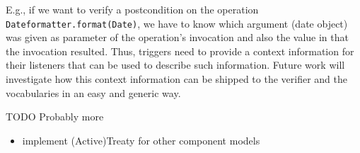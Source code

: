 \documentclass{llncs}
\begin{document}
E.g., if we want to verify a postcondition on the operation \texttt{Date\-for\-mat\-ter\linebreak[0].for\-mat(Date)}, we have to know which argument (date object) was given as parameter of the operation's invocation and also the value in that the invocation resulted. Thus, triggers need to provide a context information for their listeners that can be used to describe such information. Future work will investigate how this context information can be shipped to the verifier and the vocabularies in an easy and generic way.

TODO Probably more

\begin{itemize}
	\item implement (Active)Treaty for other component models
\end{itemize}



  
    
\end{document}
